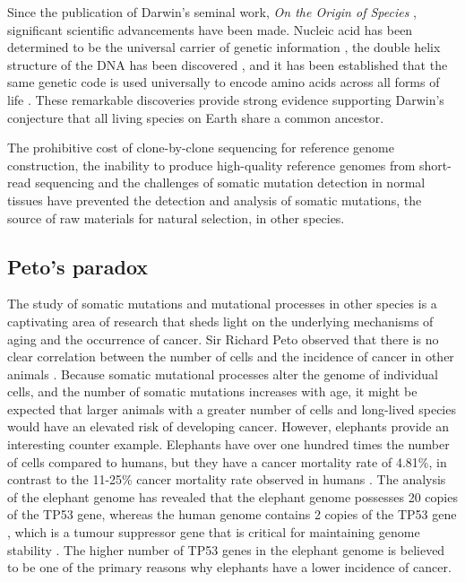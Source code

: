 Since the publication of Darwin's seminal work, \textit{On the Origin of Species} \cite{Darwin1859}, significant scientific advancements have been made. Nucleic acid has been determined to be the universal carrier of genetic information \cite{Avery1944-lr}, the double helix structure of the DNA has been discovered \cite{Watson1953-lr}, and it has been established that the same genetic code is used universally to encode amino acids across all forms of life \cite{Woese1968-lr}. These remarkable discoveries provide strong evidence supporting Darwin's conjecture that all living species on Earth share a common ancestor.

The prohibitive cost of clone-by-clone sequencing for reference genome construction, the inability to produce high-quality reference genomes from short-read sequencing and the challenges of somatic mutation detection in normal tissues have prevented the detection and analysis of somatic mutations, the source of raw materials for natural selection, in other species.

\subsection{Peto’s paradox}

The study of somatic mutations and mutational processes in other species is a captivating area of research that sheds light on the underlying mechanisms of aging and the occurrence of cancer. Sir Richard Peto observed that there is no clear correlation between the number of cells and the incidence of cancer in other animals \cite{Peto2016-wf, Vincze2022-tw}. Because somatic mutational processes alter the genome of individual cells, and the number of somatic mutations increases with age, it might be expected that larger animals with a greater number of cells and long-lived species would have an elevated risk of developing cancer. However, elephants provide an interesting counter example. Elephants have over one hundred times the number of cells compared to humans, but they have a cancer mortality rate of 4.81\%, in contrast to the 11-25\% cancer mortality rate observed in humans \cite{Abegglen2015-ao}. The analysis of the elephant genome has revealed that the elephant genome possesses 20 copies of the TP53 gene, whereas the human genome contains 2 copies of the TP53 gene \cite{Sulak2016-ld}, which is a tumour suppressor gene that is critical for maintaining genome stability \cite{Vousden2009-wd}. The higher number of TP53 genes in the elephant genome is believed to be one of the primary reasons why elephants have a lower incidence of cancer.


